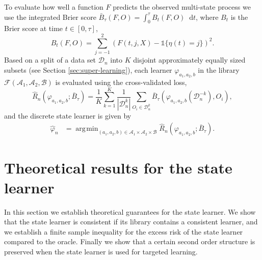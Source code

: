 \documentclass[11pt]{article}
\theoremstyle{thmstyleone}%
\theoremstyle{thmstyletwo}%
\theoremstyle{thmstylethree}%
\renewcommand{\phi}{\varphi}
\newcommand*\diff{\mathop{}\!\mathrm{d}}
\newcommand{\1}{\mathds{1}}
\DeclareMathOperator*{\argmin}{\arg\!\min}
\newcommand{\data}{\ensuremath{\mathcal{D}}}
\begin{document}
To evaluate how well a function \( F \) predicts the observed
multi-state process we use the integrated Brier score
\( \bar B_\tau( F,O) = \int_0^{\tau} B_t(F,O) \diff t \), where \( B_t \) is the
Brier score \citep{brier1950verification} at time \( t \in [0, \tau] \),
\begin{equation*}
  B_t(F,O) = \sum_{j=-1}^{2}
  \left(
      F(t,j,X) - \1{\{\eta(t)=j\}}
  \right)^2.
\end{equation*}
Based on a split of a data set \(\data_n\) into $K$ disjoint
approximately equally sized subsets (see Section \ref{sec:super-learning}), each learner
\( \phi_{a_1, a_2, b} \) in the library
\( \mathcal{F}(\mathcal{A}_1, \mathcal{A}_2, \mathcal{B}) \) is
evaluated using the cross-validated loss,
\begin{equation*}
  \hat{R}_{n}(\phi_{a_1,a_2,b} ; \bar{B}_{\tau}) =
  \frac{1}{K}\sum_{k=1}^{K}
  \frac{1}{| \data_n^{k} |}\sum_{O_i \in \data_n^{k}}
  \bar B_\tau
  {
    \left(
      \phi_{a_1,a_2,b}{ (\data_n^{-k})}
      , O_i
    \right)
  },
\end{equation*}
and the discrete state learner is given by
\begin{align*}\label{eq:discrete-state-learner}
  \hat{\phi}_n
  &=  \argmin_{(a_1,a_2,b)\in \mathcal{A}_1\times\mathcal{A}_2\times\mathcal{B}}
    \hat{R}_{n}(\phi_{a_1,a_2,b} ; \bar{B}_{\tau}).
\end{align*}


\section{Theoretical results for the state learner}
\label{sec:theor-results-prop}

In this section we establish theoretical guarantees for the state learner. We
show that the state learner is consistent if its library contains a consistent
learner, and we establish a finite sample inequality for the excess risk of the
state learner compared to the oracle. Finally we show that a certain second
order structure is preserved when the state learner is used for targeted
learning.
\end{document}
